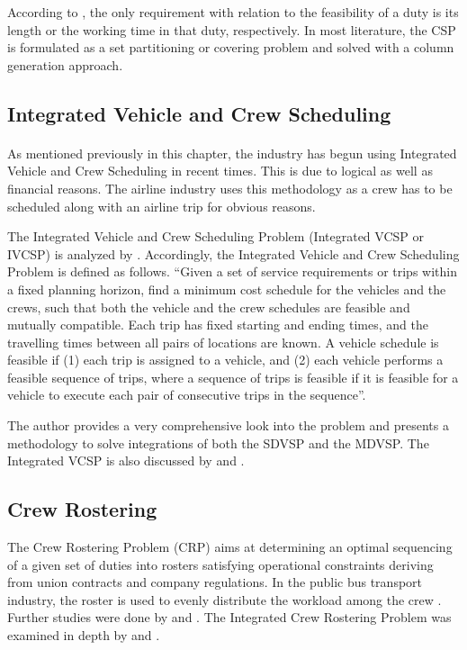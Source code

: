 \documentclass[12pt, oneside]{report}
\begin{document}
According to \citep{Huisman2004}, the only requirement with relation to the feasibility of a duty is its length or the working time in that duty, respectively. In most literature, the CSP is formulated as a set partitioning or covering problem and solved with a column generation approach.

\subsection {Integrated Vehicle and Crew Scheduling}

\paragraph{ } As mentioned previously in this chapter, the industry has begun using Integrated Vehicle and Crew Scheduling in recent times. This is due to logical as well as financial reasons. The airline industry uses this methodology as a crew has to be scheduled along with an airline trip for obvious reasons.

The Integrated Vehicle and Crew Scheduling Problem (Integrated VCSP or IVCSP) is analyzed by \citet{Huisman2004}. Accordingly, the Integrated Vehicle and Crew Scheduling Problem is defined as follows. “Given a set of service requirements or trips within a fixed planning horizon, find a minimum cost schedule for the vehicles and the crews, such that both the vehicle and the crew schedules are feasible and mutually compatible. Each trip has fixed starting and ending times, and the travelling times between all pairs of locations are known. A vehicle schedule is feasible if (1) each trip is assigned to a vehicle, and (2) each vehicle performs a feasible sequence of trips, where a sequence of trips is feasible if it is feasible for a vehicle to execute each pair of consecutive trips in the sequence”.

The author provides a very comprehensive look into the problem and presents a methodology to solve integrations of both the SDVSP and the MDVSP. The Integrated VCSP is also discussed by \citet{Freling2000} and \citet{Wren1997}.

\subsection {Crew Rostering}

The Crew Rostering Problem (CRP) aims at determining an optimal sequencing of a given set of duties into rosters satisfying operational constraints deriving from union contracts and company regulations. In the public bus transport industry, the roster is used to evenly distribute the workload among the crew \citep{Caprara1995}. Further studies were done by \citep{Kharraziha2003} and \citep{Tian2012}. The Integrated Crew Rostering Problem was examined in depth by \citep{Valdes2010} and \citep{Xie2012}.
\end{document}
